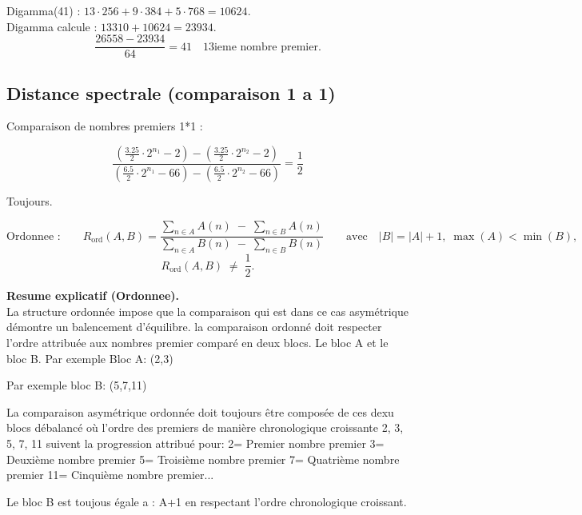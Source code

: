 \documentclass[a4paper,11pt]{article}
\begin{document}
Digamma(41) : \(13 \cdot 256 + 9 \cdot 384 + 5 \cdot 768 = 10624\).\\
Digamma calcule : \(13310 + 10624 = 23934\).\\

\[
\frac{26558 - 23934}{64} = 41 \quad \text{13ieme nombre premier.}
\]

\bigskip

\subsection*{Distance spectrale (comparaison 1 a 1)}

Comparaison de nombres premiers 1*1 :

\[
\frac{
\left(\frac{3.25}{2} \cdot 2^{n_{1}} - 2\right)
-
\left(\frac{3.25}{2} \cdot 2^{n_{2}} - 2\right)
}{
\left(\frac{6.5}{2} \cdot 2^{n_{1}} - 66\right)
-
\left(\frac{6.5}{2} \cdot 2^{n_{2}} - 66\right)
}
= \frac{1}{2}
\]

Toujours.

\[
\text{Ordonnee :}\qquad
R_{\mathrm{ord}}(A,B)
=
\frac{\displaystyle \sum_{n \in A} A(n)\;-\;\sum_{n \in B} A(n)}
     {\displaystyle \sum_{n \in A} B(n)\;-\;\sum_{n \in B} B(n)}
\qquad\text{avec}\quad |B| = |A| + 1,\; \max(A) < \min(B),
\]
\[
R_{\mathrm{ord}}(A,B) \;\neq\; \frac{1}{2}.
\]

\textbf{Resume explicatif (Ordonnee).} \\
La structure ordonnée impose que la comparaison qui est dans ce cas asymétrique démontre un balencement d'équilibre. 
la comparaison ordonné doit respecter l'ordre attribuée aux nombres premier comparé en deux blocs. Le bloc A et le bloc B.
Par exemple Bloc A: (2,3)

Par exemple bloc B: (5,7,11)

La comparaison asymétrique ordonnée doit toujours être composée de ces dexu blocs débalancé où l'ordre des premiers de manière chronologique 
croissante 2, 3, 5, 7, 11 suivent la progression attribué pour:
2= Premier nombre premier
3= Deuxième nombre premier
5= Troisième nombre premier
7= Quatrième nombre premier
11= Cinquième nombre premier...

Le bloc B est toujous égale a : A+1 en respectant l'ordre chronologique croissant. 
\end{document}
